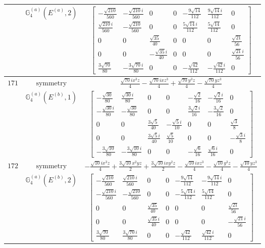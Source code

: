 \documentclass[fleqn,8pt,landscape]{jsarticle}
\begin{document}
\begin{longtable}{ccc}
$  $ & $ \mathbb{G}_{4}^{(a)}(E^{(a)},2) $ & $ \begin{bmatrix} - \frac{\sqrt{210}}{560} & - \frac{\sqrt{210} i}{560} & 0 & 0 & - \frac{9 \sqrt{14}}{112} & \frac{9 \sqrt{14} i}{112} & 0 \\ \frac{\sqrt{210} i}{560} & - \frac{\sqrt{210}}{560} & 0 & 0 & \frac{5 \sqrt{14} i}{112} & \frac{5 \sqrt{14}}{112} & 0 \\ 0 & 0 & \frac{\sqrt{35}}{40} & 0 & 0 & 0 & \frac{\sqrt{21}}{56} \\ 0 & 0 & - \frac{\sqrt{35} i}{40} & 0 & 0 & 0 & \frac{\sqrt{21} i}{56} \\ \frac{3 \sqrt{70}}{80} & - \frac{3 \sqrt{70} i}{80} & 0 & 0 & - \frac{\sqrt{42}}{112} & - \frac{\sqrt{42} i}{112} & 0 \end{bmatrix} $ \\ \hline
$ 171 $ & $ \text{symmetry} $ & $ \frac{\sqrt{70} i x^{3} z}{4} - \frac{\sqrt{70} i x z^{3}}{4} + \frac{\sqrt{70} y^{3} z}{4} - \frac{\sqrt{70} y z^{3}}{4} $ \\
$  $ & $ \mathbb{G}_{4}^{(a)}(E^{(b)},1) $ & $ \begin{bmatrix} - \frac{\sqrt{30}}{80} & \frac{\sqrt{30} i}{80} & 0 & 0 & - \frac{\sqrt{2}}{16} & - \frac{\sqrt{2} i}{16} & 0 \\ - \frac{\sqrt{30} i}{80} & - \frac{\sqrt{30}}{80} & 0 & 0 & \frac{3 \sqrt{2} i}{16} & - \frac{3 \sqrt{2}}{16} & 0 \\ 0 & 0 & \frac{3 \sqrt{5}}{40} & - \frac{\sqrt{5} i}{10} & 0 & 0 & \frac{\sqrt{3}}{8} \\ 0 & 0 & \frac{3 \sqrt{5} i}{40} & \frac{\sqrt{5}}{10} & 0 & 0 & - \frac{\sqrt{3} i}{8} \\ - \frac{3 \sqrt{10}}{80} & - \frac{3 \sqrt{10} i}{80} & 0 & 0 & - \frac{\sqrt{6}}{16} & \frac{\sqrt{6} i}{16} & 0 \end{bmatrix} $ \\ \hline
$ 172 $ & $ \text{symmetry} $ & $ - \frac{\sqrt{10} i x^{3} z}{4} + \frac{3 \sqrt{10} x^{2} y z}{2} + \frac{3 \sqrt{10} i x y^{2} z}{2} - \frac{\sqrt{10} i x z^{3}}{4} - \frac{\sqrt{10} y^{3} z}{4} - \frac{\sqrt{10} y z^{3}}{4} $ \\
$  $ & $ \mathbb{G}_{4}^{(a)}(E^{(b)},2) $ & $ \begin{bmatrix} - \frac{\sqrt{210}}{560} & \frac{\sqrt{210} i}{560} & 0 & 0 & - \frac{9 \sqrt{14}}{112} & - \frac{9 \sqrt{14} i}{112} & 0 \\ - \frac{\sqrt{210} i}{560} & - \frac{\sqrt{210}}{560} & 0 & 0 & - \frac{5 \sqrt{14} i}{112} & \frac{5 \sqrt{14}}{112} & 0 \\ 0 & 0 & \frac{\sqrt{35}}{40} & 0 & 0 & 0 & \frac{\sqrt{21}}{56} \\ 0 & 0 & \frac{\sqrt{35} i}{40} & 0 & 0 & 0 & - \frac{\sqrt{21} i}{56} \\ \frac{3 \sqrt{70}}{80} & \frac{3 \sqrt{70} i}{80} & 0 & 0 & - \frac{\sqrt{42}}{112} & \frac{\sqrt{42} i}{112} & 0 \end{bmatrix} $ \\ \hline

\end{longtable}
\end{document}
